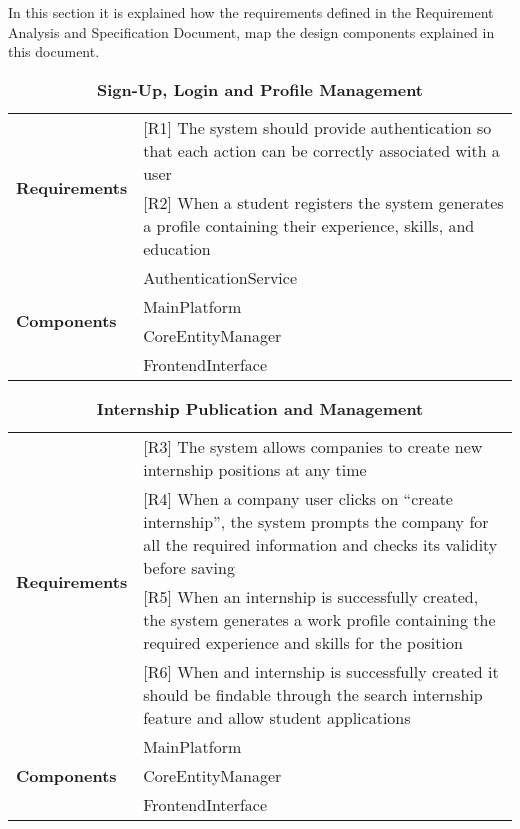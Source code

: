 In this section it is explained how the requirements defined in the Requirement Analysis and Specification Document, map the design components explained in this document.

\renewcommand{\arraystretch}{1.3}
\begin{longtable}{|p{}|p{}|}
\caption{\textbf{Sign-Up, Login and Profile Management}} \\ \hline
\multirow{2}{*}{\textbf{Requirements}} & [R1] The system should provide authentication so that each action can be correctly associated with a user \\ 
& [R2] When a student registers the system generates a profile containing their experience, skills, and education \\ \hline
\multirow{4}{*}{\textbf{Components}} 
& AuthenticationService \\ 
& MainPlatform \\ 
& CoreEntityManager \\
& FrontendInterface \\ \hline
\end{longtable}


\renewcommand{\arraystretch}{1.3}
\begin{longtable}{|p{}|p{}|}
\caption{\textbf{Internship Publication and Management}} \\ \hline
\multirow{4}{*}{\textbf{Requirements}} 
& [R3] The system allows companies to create new internship positions at any time \\ 
& [R4] When a company user clicks on “create internship”, the system prompts the company for all the required information and checks its validity before saving \\ 
& [R5] When an internship is successfully created, the system generates a work profile containing the required experience and skills for the position \\
& [R6] When and internship is successfully created it should be findable through the search internship feature and allow student applications \\
\hline
\multirow{3}{*}{\textbf{Components}} 
& MainPlatform \\ 
& CoreEntityManager \\
& FrontendInterface \\ \hline
\end{longtable}

